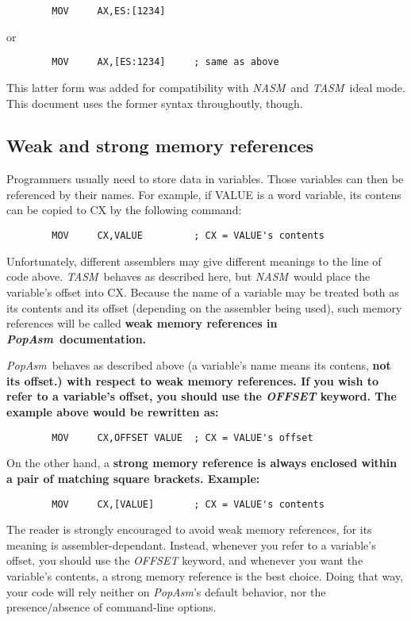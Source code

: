 \documentclass[a4paper,12pt]{book}
\newcommand{\popasm}{\emph{PopAsm}}
\newcommand{\nasm}{\emph{NASM}}
\newcommand{\tasm}{\emph{TASM}}
\begin{document}
\begin{verbatim}
        MOV     AX,ES:[1234]
\end{verbatim}

or

\begin{verbatim}
        MOV     AX,[ES:1234]     ; same as above
\end{verbatim}

This latter form was added for compatibility with \nasm\ and \tasm\ ideal mode.
This document uses the former syntax throughoutly, though.

\subsection{Weak and strong memory references}
Programmers usually need to store data in variables. Those variables can then
be referenced by their names. For example, if VALUE is a word variable, its
contens can be copied to CX by the following command:

\begin{verbatim}
        MOV     CX,VALUE         ; CX = VALUE's contents
\end{verbatim}

Unfortunately, different assemblers may give different meanings to the line
of code above. \tasm\ behaves as described here, but \nasm\ would place the
variable's offset into CX. Because the name of a variable may be treated both
as its contents and its offset (depending on the assembler being used), such
memory references will be called \bf{weak memory references} in \popasm\ 
documentation.

\popasm\ behaves as described above (a variable's name means its contens, \bf{not}
its offset.) with respect to weak memory references. If you wish to refer to
a variable's offset, you should use the \emph{OFFSET} keyword. The example
above would be rewritten as:

\begin{verbatim}
        MOV     CX,OFFSET VALUE  ; CX = VALUE's offset
\end{verbatim}

On the other hand, a \bf{strong memory reference} is always enclosed within a
pair of matching square brackets. Example:

\begin{verbatim}
        MOV     CX,[VALUE]       ; CX = VALUE's contents
\end{verbatim}

The reader is strongly encouraged to avoid weak memory references, for its
meaning is assembler-dependant. Instead, whenever you refer to a variable's
offset, you should use the \emph{OFFSET} keyword, and whenever you want the
variable's contents, a strong memory reference is the best choice. Doing
that way, your code will rely neither on \popasm's default behavior, nor the
presence/absence of command-line options.
\end{document}
